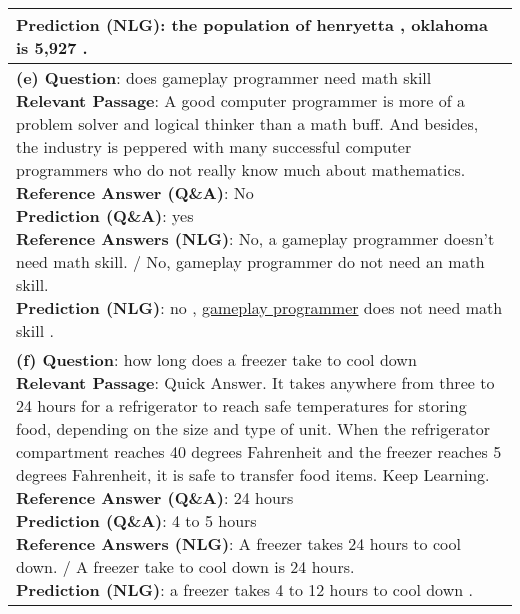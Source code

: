 \documentclass[11pt,a4paper]{article}
\newcommand{\cmark}{\ding{51}}%
\newcommand{\xmark}{\ding{55}}%
\theoremstyle{mydef}
\theoremstyle{myprob}
\begin{document}
\begin{table*}[h!]
{\begin{tabular}{p{50em}}
{\textbf{Prediction (NLG)}:  the population of henryetta , oklahoma is 5,927 . \cmark
}
\vspace{1pt}
\\ \hline 
\vspace{0.5pt}
\pbox{50em}{
\textbf{(e) Question}: does gameplay programmer need math skill\\
\textbf{Relevant Passage}: A good computer programmer is more of a problem solver and logical thinker than a math buff. And besides, the industry is peppered with many successful computer programmers who do not really know much about mathematics. \\
\textbf{Reference Answer (Q\&A)}: No \\
\textbf{Prediction (Q\&A)}: yes \xmark \\
\textbf{Reference Answers (NLG)}: No, a gameplay programmer doesn't need math skill. / No, gameplay programmer do not need an math skill.\\
\textbf{Prediction (NLG)}: no , \underline{gameplay programmer} does not need math skill . \cmark
}
\vspace{1pt}
\\ \hline
\vspace{0.5pt}
\pbox{50em}{
\textbf{(f) Question}: how long does a freezer take to cool down\\
\textbf{Relevant Passage}: Quick Answer. It takes anywhere from three to 24 hours for a refrigerator to reach safe temperatures for storing food, depending on the size and type of unit. When the refrigerator compartment reaches 40 degrees Fahrenheit and the freezer reaches 5 degrees Fahrenheit, it is safe to transfer food items. Keep Learning. \\
\textbf{Reference Answer (Q\&A)}: 24 hours\\
\textbf{Prediction (Q\&A)}: 4 to 5 hours \xmark \\
\textbf{Reference Answers (NLG)}: A freezer takes 24 hours to cool down. / A  freezer take to cool down is 24 hours.\\
\textbf{Prediction (NLG)}: a freezer takes 4 to 12 hours to cool down . \xmark
}
\vspace{1pt}
\\ \hline
\end{tabular}
}
\end{table*}
\end{document}
